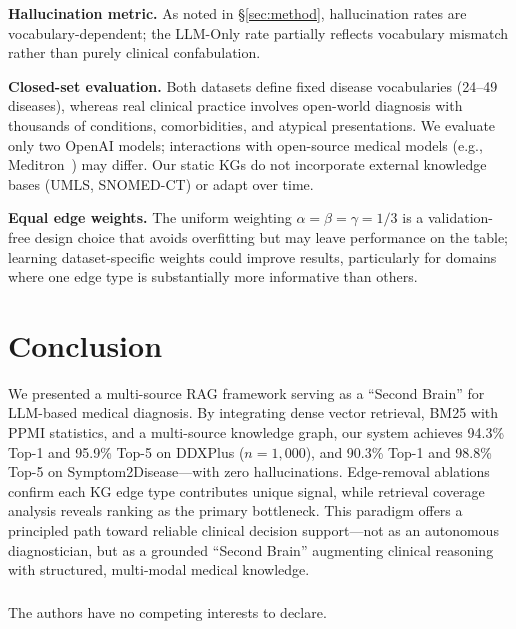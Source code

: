 \documentclass[runningheads]{llncs}
\begin{document}
\textbf{Hallucination metric.} As noted in \S\ref{sec:method}, hallucination rates are vocabulary-dependent; the LLM-Only rate partially reflects vocabulary mismatch rather than purely clinical confabulation.

\textbf{Closed-set evaluation.} Both datasets define fixed disease vocabularies (24--49 diseases), whereas real clinical practice involves open-world diagnosis with thousands of conditions, comorbidities, and atypical presentations. We evaluate only two OpenAI models; interactions with open-source medical models (e.g., Meditron~\cite{chen2023meditron}) may differ. Our static KGs do not incorporate external knowledge bases (UMLS, SNOMED-CT) or adapt over time.

\textbf{Equal edge weights.} The uniform weighting $\alpha = \beta = \gamma = 1/3$ is a validation-free design choice that avoids overfitting but may leave performance on the table; learning dataset-specific weights could improve results, particularly for domains where one edge type is substantially more informative than others.

\section{Conclusion}
\label{sec:conclusion}

We presented a multi-source RAG framework serving as a ``Second Brain'' for LLM-based medical diagnosis. By integrating dense vector retrieval, BM25 with PPMI statistics, and a multi-source knowledge graph, our system achieves 94.3\% Top-1 and 95.9\% Top-5 on DDXPlus ($n{=}1{,}000$), and 90.3\% Top-1 and 98.8\% Top-5 on Symptom2Disease---with zero hallucinations. Edge-removal ablations confirm each KG edge type contributes unique signal, while retrieval coverage analysis reveals ranking as the primary bottleneck. This paradigm offers a principled path toward reliable clinical decision support---not as an autonomous diagnostician, but as a grounded ``Second Brain'' augmenting clinical reasoning with structured, multi-modal medical knowledge.

\begin{credits}
\subsubsection{\discintname}
The authors have no competing interests to declare.
\end{credits}
\end{document}

